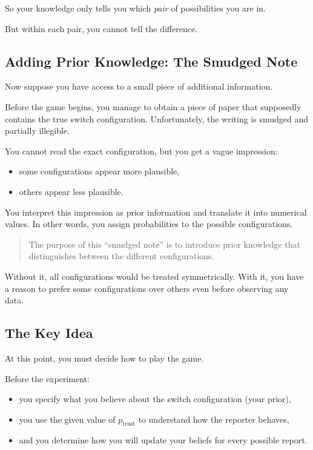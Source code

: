 \documentclass[11pt]{article}
\theoremstyle{remark}
\begin{document}
So your knowledge only tells you which \emph{pair} of possibilities you are in.

But within each pair, you cannot tell the difference.

\vspace{3mm}

\subsection{Adding Prior Knowledge: The Smudged Note}

Now suppose you have access to a small piece of additional information.

Before the game begins, you manage to obtain a piece of paper that supposedly contains the true switch configuration. Unfortunately, the writing is smudged and partially illegible.

You cannot read the exact configuration, but you get a vague impression:

\begin{itemize}
    \item some configurations appear more plausible,
    \item others appear less plausible.
\end{itemize}

You interpret this impression as prior information and translate it into numerical values. In other words, you assign probabilities to the possible configurations.

\vspace{2mm}

\begin{quote}
The purpose of this ``smudged note'' is to introduce prior knowledge that distinguishes between the different configurations.
\end{quote}

Without it, all configurations would be treated symmetrically. With it, you have a reason to prefer some configurations over others even before observing any data.

\vspace{3mm}

\subsection{The Key Idea}

At this point, you must decide how to play the game.

Before the experiment:
\begin{itemize}
    \item you specify what you believe about the switch configuration (your prior),
    \item you use the given value of \(p_{\text{trust}}\) to understand how the reporter behaves,
    \item and you determine how you will update your beliefs for every possible report.
\end{itemize}
\end{document}

